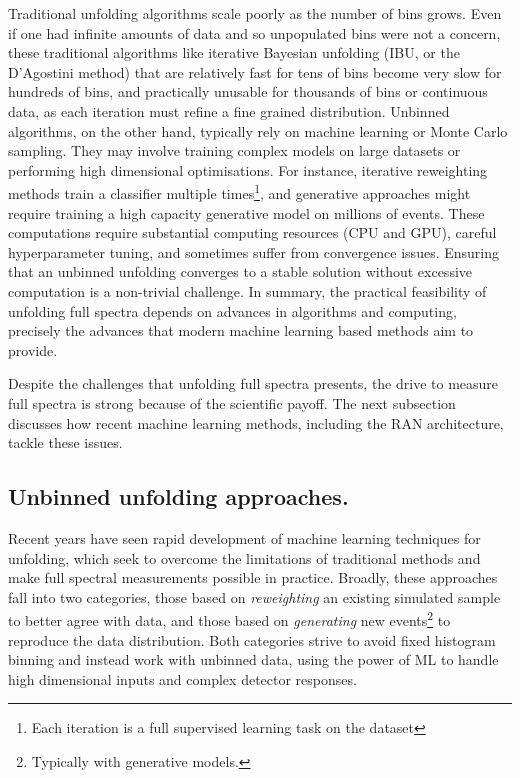 {        Traditional unfolding algorithms scale poorly as the number of bins grows.
        Even if one had infinite amounts of data and so unpopulated bins were not a concern, these traditional algorithms like iterative Bayesian unfolding (IBU, or the D'Agostini method) that are relatively fast for tens of bins become very slow for hundreds of bins, and practically unusable for thousands of bins or continuous data, as each iteration must refine a fine grained distribution.
        Unbinned algorithms, on the other hand, typically rely on machine learning or Monte Carlo sampling.
        They may involve training complex models on large datasets or performing high dimensional optimisations.
        For instance, iterative reweighting methods train a classifier multiple times\footnote{Each iteration is a full supervised learning task on the dataset}, and generative approaches might require training a high capacity generative model on millions of events.
        These computations require substantial computing resources (CPU and GPU), careful hyperparameter tuning, and sometimes suffer from convergence issues.
        Ensuring that an unbinned unfolding converges to a stable solution without excessive computation is a non-trivial challenge.
        In summary, the practical feasibility of unfolding full spectra depends on advances in algorithms and computing, precisely the advances that modern machine learning based methods aim to provide.
        
        Despite the challenges that unfolding full spectra presents, the drive to measure full spectra is strong because of the scientific payoff.
        The next subsection discusses how recent machine learning methods, including the RAN architecture, tackle these issues.

    \subsection{Unbinned unfolding approaches.}
        Recent years have seen rapid development of machine learning techniques for unfolding, which seek to overcome the limitations of traditional methods and make full spectral measurements possible in practice.
        Broadly, these approaches fall into two categories, those based on \textit{reweighting} an existing simulated sample to better agree with data, and those based on \textit{generating} new events\footnote{Typically with generative models.} to reproduce the data distribution.
        Both categories strive to avoid fixed histogram binning and instead work with unbinned data, using the power of ML to handle high dimensional inputs and complex detector responses.

}
